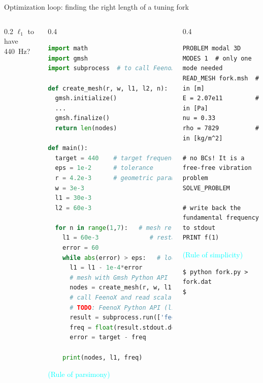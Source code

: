 \documentclass[
  ignorenonframetext,
  aspectratio=169,
]{beamer}
\begin{document}
\begin{frame}[fragile]{Optimization loop: finding the right length of a
tuning fork}
\begin{columns}[T]
\begin{column}{0.2\textwidth}
\(\ell_1\) to have 440~Hz?
\end{column}

\pause

\begin{column}{0.4\textwidth}
\begin{lstlisting}[language=Python, style=python]
import math
import gmsh
import subprocess  # to call FeenoX and read back

def create_mesh(r, w, l1, l2, n):
  gmsh.initialize()
  ...
  gmsh.finalize()
  return len(nodes)
  
def main():
  target = 440    # target frequency
  eps = 1e-2      # tolerance
  r = 4.2e-3      # geometric parameters
  w = 3e-3
  l1 = 30e-3
  l2 = 60e-3

  for n in range(1,7):   # mesh refinement level
    l1 = 60e-3              # restart l1 & error
    error = 60
    while abs(error) > eps:   # loop
      l1 = l1 - 1e-4*error
      # mesh with Gmsh Python API
      nodes = create_mesh(r, w, l1, l2, n)
      # call FeenoX and read scalar back
      # TODO: FeenoX Python API (like Gmsh)
      result = subprocess.run(['feenox', 'fork.fee'], stdout=subprocess.PIPE)
      freq = float(result.stdout.decode('utf-8'))
      error = target - freq
    
    print(nodes, l1, freq)
\end{lstlisting}

\vspace{-0.25cm}\hfill{\footnotesize\textcolor{cyan}{(Rule of {parsimony})}}
\end{column}

\begin{column}{0.4\textwidth}
\begin{lstlisting}[style=feenox]
PROBLEM modal 3D MODES 1  # only one mode needed
READ_MESH fork.msh  # in [m]
E = 2.07e11         # in [Pa]
nu = 0.33
rho = 7829          # in [kg/m^2]

# no BCs! It is a free-free vibration problem
SOLVE_PROBLEM

# write back the fundamental frequency to stdout
PRINT f(1)
\end{lstlisting}

\vspace{-0.25cm}\hfill{\footnotesize\textcolor{cyan}{(Rule of {simplicity})}}

\pause

\begin{lstlisting}[style=terminal]
$ python fork.py > fork.dat
$
\end{lstlisting}


\end{column}
\end{columns}
\end{frame}
\end{document}
